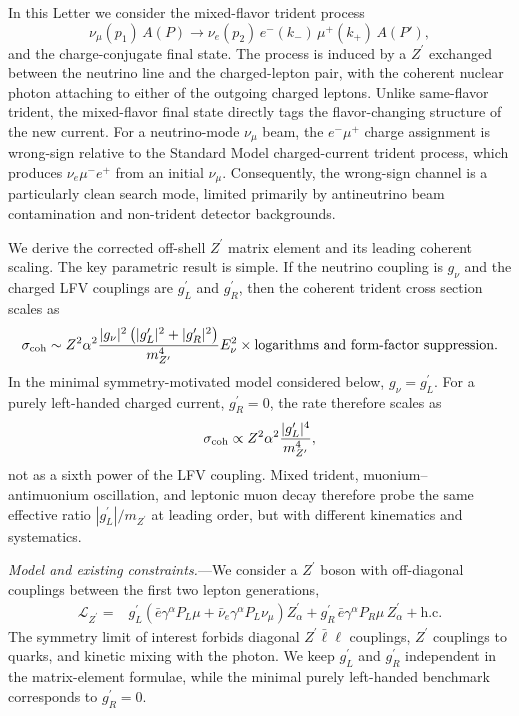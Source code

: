 \documentclass[
  aps,
  prl,
  twocolumn,
  superscriptaddress,
  amsmath, amssymb,
  floatfix, nofootinbib,
  longbibliography,
]{revtex4-2}
\newcommand{\numu}{\nu_\mu}
\newcommand{\nue}{\nu_e}
\newcommand{\Zp}{Z^{\prime}}
\newcommand{\mZp}{m_{\Zp}}
\newcommand{\Enu}{E_\nu}
\newcommand{\gL}{{g^{\prime}_L}}
\newcommand{\gR}{{g^{\prime}_R}}
\newcommand{\gnu}{{g_\nu}}
\newcommand{\PL}{P_L}
\newcommand{\PR}{P_R}
\begin{document}
In this Letter we consider the mixed-flavor trident process
\begin{equation}
  \numu(p_1)\, A(P) \to
  \nue(p_2)\, e^-(k_-)\, \mu^+(k_+)\, A(P'),
\label{eq:lfv-trident}
\end{equation}
and the charge-conjugate final state.  The process is induced by a
$\Zp$ exchanged between the neutrino line and the charged-lepton pair,
with the coherent nuclear photon attaching to either of the outgoing
charged leptons.  Unlike same-flavor trident, the mixed-flavor final
state directly tags the flavor-changing structure of the new current.
For a neutrino-mode $\numu$ beam, the $e^-\mu^+$ charge assignment is
wrong-sign relative to the Standard Model charged-current trident
process, which produces $\nue\mu^-e^+$ from an initial $\numu$.
Consequently, the wrong-sign channel is a particularly clean search
mode, limited primarily by antineutrino beam contamination and
non-trident detector backgrounds.

We derive the corrected off-shell $\Zp$ matrix element and its leading
coherent scaling.  The key parametric result is simple.  If the
neutrino coupling is $\gnu$ and the charged LFV couplings are $\gL$ and
$\gR$, then the coherent trident cross section scales as
\begin{equation}
  \sigma_{\rm coh}
  \sim
  Z^2\alpha^2
  \frac{|\gnu|^2\left(|\gL|^2+|\gR|^2\right)}{\mZp^4}
  \Enu^2
  \times \text{logarithms and form-factor suppression}.
\label{eq:scaling-general}
\end{equation}
In the minimal symmetry-motivated model considered below, $\gnu=\gL$.
For a purely left-handed charged current, $\gR=0$, the rate therefore
scales as
\begin{equation}
  \sigma_{\rm coh}
  \propto
  Z^2\alpha^2
  \frac{|\gL|^4}{\mZp^4},
\label{eq:scaling-left}
\end{equation}
not as a sixth power of the LFV coupling.  Mixed trident, muonium--
antimuonium oscillation, and leptonic muon decay therefore probe the
same effective ratio $|\gL|/\mZp$ at leading order, but with different
kinematics and systematics.

\textit{Model and existing constraints.}---We consider a $\Zp$ boson
with off-diagonal couplings between the first two lepton generations,
\begin{align}
  \mathcal{L}_{\Zp} ={}&
  \gL\left(
     \bar e\gamma^\alpha \PL\mu
     +\bar\nu_e\gamma^\alpha \PL\nu_\mu
  \right)\Zp_\alpha
  +\gR\,\bar e\gamma^\alpha\PR\mu\,\Zp_\alpha
  +\mathrm{h.c.}
\label{eq:Lmodel}
\end{align}
The symmetry limit of interest forbids diagonal $\Zp\bar\ell\ell$
couplings, $\Zp$ couplings to quarks, and kinetic mixing with the
photon.  We keep $\gL$ and $\gR$ independent in the matrix-element
formulae, while the minimal purely left-handed benchmark corresponds
to $\gR=0$.
\end{document}
